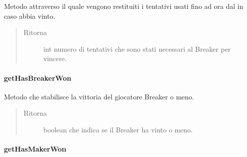 \documentclass[letterpaper,10pt,italian,openany,oneside]{sphinxmanual}
\begin{document}
\begin{fulllineitems}
\label{\detokenize{source/it/unicam/cs/pa/mastermind/gamecore/MatchState:it.unicam.cs.pa.mastermind.gamecore.MatchState.getBreakerVictoryAttempts()}}
Metodo attraverso il quale vengono restituiti i tentativi usati fino ad ora dal  in caso abbia vinto.
\begin{quote}\begin{description}
\item[{Ritorna}] \leavevmode
int numero di tentativi che sono stati necessari al Breaker per vincere.

\end{description}\end{quote}

\end{fulllineitems}



\paragraph{getHasBreakerWon}
\label{\detokenize{source/it/unicam/cs/pa/mastermind/gamecore/MatchState:gethasbreakerwon}}

\begin{fulllineitems}
\label{\detokenize{source/it/unicam/cs/pa/mastermind/gamecore/MatchState:it.unicam.cs.pa.mastermind.gamecore.MatchState.getHasBreakerWon()}}
Metodo che stabilisce la vittoria del giocatore Breaker o meno.
\begin{quote}\begin{description}
\item[{Ritorna}] \leavevmode
boolean che indica se il Breaker ha vinto o meno.

\end{description}\end{quote}

\end{fulllineitems}



\paragraph{getHasMakerWon}
\label{\detokenize{source/it/unicam/cs/pa/mastermind/gamecore/MatchState:gethasmakerwon}}
\end{document}
